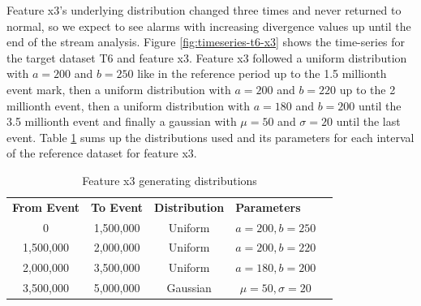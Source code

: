 Feature x3's underlying distribution changed three times and never returned to normal, so we expect to see alarms with increasing divergence values up until the end of the stream analysis. Figure \ref{fig:timeseries-t6-x3} shows the time-series for the target dataset T6 and feature x3. Feature x3 followed a uniform distribution with $a=200$ and $b=250$ like in the reference period up to the 1.5 millionth event mark, then a uniform distribution with $a=200$ and $b=220$ up to the 2 millionth event, then a uniform distribution with $a=180$ and $b=200$ until the 3.5 millionth event and finally a gaussian with $\mu=50$ and $\sigma=20$ until the last event. Table \ref{tbl:multi-feat-x3-changes} sums up the distributions used and its parameters for each interval of the reference dataset for feature x3.
\begin{table}[!htb]
    \begin{center}
    \begin{tabular}{|c|c|c|c|l}
    \cline{1-4}
    \textbf{From Event} & \textbf{To Event} & \textbf{Distribution} & \multicolumn{1}{l|}{\textbf{Parameters}} &  \\ \cline{1-4}
    0                   & 1,500,000         & Uniform               & $a=200, b=250$                           &  \\ \cline{1-4}
    1,500,000           & 2,000,000         & Uniform               & $a=200, b=220$                           &  \\ \cline{1-4}
    2,000,000            & 3,500,000         & Uniform               & $a=180, b=200$                           &  \\ \cline{1-4}
    3,500,000           & 5,000,000         & Gaussian              & $\mu=50, \sigma=20$                      &  \\ \cline{1-4}
    \end{tabular}
    \end{center}
    \caption{Feature x3 generating distributions}
    \label{tbl:multi-feat-x3-changes}
\end{table}

